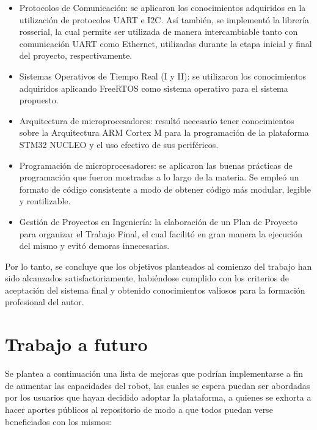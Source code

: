 \begin{itemize}

    \item Protocolos de Comunicación: se aplicaron los conocimientos adquiridos en la utilización de protocolos UART e I2C. Así también, se implementó la librería rosserial, la cual permite ser utilizada de manera intercambiable tanto con comunicación UART como Ethernet, utilizadas durante la etapa inicial y final del proyecto, respectivamente.

    \item Sistemas Operativos de Tiempo Real (I y II): se utilizaron los conocimientos adquiridos aplicando FreeRTOS como sistema operativo para el sistema propuesto.

    \item Arquitectura de microprocesadores: resultó necesario tener conocimientos sobre la Arquitectura ARM Cortex M para la programación de la plataforma STM32 NUCLEO y el uso efectivo de sus periféricos.

    \item Programación de microprocesadores: se aplicaron las buenas prácticas de programación que fueron mostradas a lo largo de la materia. Se empleó un formato de código consistente a modo de obtener código más modular, legible y reutilizable.

    \item Gestión de Proyectos en Ingeniería: la elaboración de un Plan de Proyecto para organizar el Trabajo Final, el cual facilitó en gran manera la ejecución del mismo y evitó demoras innecesarias.

\end{itemize}

Por lo tanto, se concluye que los objetivos planteados al comienzo del trabajo han sido alcanzados satisfactoriamente, habiéndose cumplido con los criterios de aceptación del sistema final y obtenido conocimientos valiosos para la formación profesional del autor.

\section{Trabajo a futuro}

Se plantea a continuación una lista de mejoras que podrían implementarse a fin de aumentar las capacidades del robot, las cuales se espera puedan ser abordadas por los usuarios que hayan decidido adoptar la plataforma, a quienes se exhorta a hacer aportes públicos al repositorio de modo a que todos puedan verse beneficiados con los mismos:

